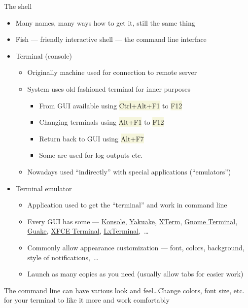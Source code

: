 \documentclass[compress, ucs, xelatex, 11pt, xcolor=svgnames, aspectratio=169,
	hyperref={
		bookmarks=true,
		unicode=true,
		colorlinks=true,
		pdftitle={Linux, command line and MetaCentrum},
		plainpages=false,
		pdfauthor={Vojtech Zeisek},
		pdfsubject={Course about use of Linux command line, writing shell scripts and using MetaCentrum of CESNET},
		pdfcreator={XeLaTeX},
		pdfkeywords={Linux, GNU, BASH, shell, command line, MetaCentrum},
		linkcolor=DarkRed, %
		anchorcolor=DarkBlue, %
		citecolor=Indigo, %
		filecolor=NavyBlue, %
		menucolor=DarkMagenta, %
		urlcolor=DarkBlue, %
		pdftex},
	url={hyphens, lowtilde} %
	]{beamer}
\renewcommand{\texttt}[1]{\colorbox{Beige}{{\ttfamily #1}}}
\begin{document}
\begin{frame}{The shell}
	\begin{itemize}
		\item Many names, many ways how to get it, still the same thing
		\item Fish --- friendly interactive shell --- the command line interface
		\item Terminal (console)
		\begin{itemize}
			\item Originally machine used for connection to remote server
			\item System uses old fashioned terminal for inner purposes
			\begin{itemize}
				\item From GUI available using \texttt{Ctrl+Alt+F1} to \texttt{F12}
				\item Changing terminals using \texttt{Alt+F1} to \texttt{F12}
				\item Return back to GUI using \texttt{Alt+F7}
				\item Some are used for log outputs etc.
			\end{itemize}
			\item Nowadays used \enquote{indirectly} with special applications (\enquote{emulators})
		\end{itemize}
		\item Terminal emulator
		\begin{itemize}
			\item Application used to get the \enquote{terminal} and work in command line
			\item Every GUI has some --- \href{https://konsole.kde.org/}{Konsole}, \href{https://apps.kde.org/yakuake}{Yakuake}, \href{https://invisible-island.net/xterm/}{XTerm}, \href{https://wiki.gnome.org/Apps/Terminal}{Gnome Terminal}, \href{http://guake.org/}{Guake}, \href{https://docs.xfce.org/apps/terminal/start}{XFCE Terminal}, \href{https://github.com/lxde/lxterminal}{LxTerminal},~\ldots
			\item Commonly allow appearance customization --- font, colors, background, style of notifications,~\ldots
			\item Launch as many copies as you need (usually allow tabs for easier work)
		\end{itemize}
	\end{itemize}
\end{frame}

\begin{frame}{The command line can have various look and feel\ldots}{Change colors, font size, etc. for your terminal to like it more and work comfortably}
	\begin{center}
		\texttt{[image: terminals.png]}
	\end{center}
\end{frame}
\end{document}
